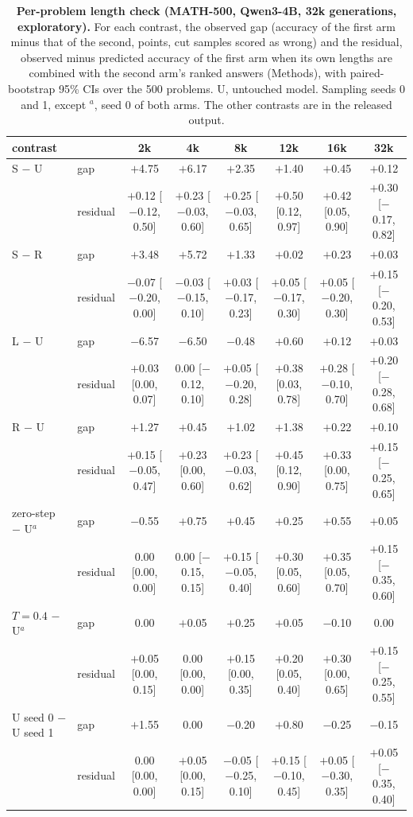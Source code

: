 \documentclass[10pt]{article}
\begin{document}
\begin{table}[h]
\centering\scriptsize
\caption{\textbf{Per-problem length check (MATH-500, Qwen3-4B, 32k generations, exploratory).} For each contrast, the observed gap (accuracy of the first arm minus that of the second, points, cut samples scored as wrong) and the residual, observed minus predicted accuracy of the first arm when its own lengths are combined with the second arm's ranked answers (Methods), with paired-bootstrap 95\% CIs over the 500 problems. U, untouched model. Sampling seeds 0 and 1, except $^{a}$, seed 0 of both arms. The other contrasts are in the released output.}
\label{tab:spred}
\setlength{\tabcolsep}{2.5pt}
\begin{tabular}{llcccccc}
\toprule
contrast & & 2k & 4k & 8k & 12k & 16k & 32k \\
\midrule
S $-$ U & gap & $+$4.75 & $+$6.17 & $+$2.35 & $+$1.40 & $+$0.45 & $+$0.12 \\
 & residual & $+$0.12 [$-$0.12, 0.50] & $+$0.23 [$-$0.03, 0.60] & $+$0.25 [$-$0.03, 0.65] & $+$0.50 [0.12, 0.97] & $+$0.42 [0.05, 0.90] & $+$0.30 [$-$0.17, 0.82] \\[2pt]
S $-$ R & gap & $+$3.48 & $+$5.72 & $+$1.33 & $+$0.02 & $+$0.23 & $+$0.03 \\
 & residual & $-$0.07 [$-$0.20, 0.00] & $-$0.03 [$-$0.15, 0.10] & $+$0.03 [$-$0.17, 0.23] & $+$0.05 [$-$0.17, 0.30] & $+$0.05 [$-$0.20, 0.30] & $+$0.15 [$-$0.20, 0.53] \\[2pt]
L $-$ U & gap & $-$6.57 & $-$6.50 & $-$0.48 & $+$0.60 & $+$0.12 & $+$0.03 \\
 & residual & $+$0.03 [0.00, 0.07] & 0.00 [$-$0.12, 0.10] & $+$0.05 [$-$0.20, 0.28] & $+$0.38 [0.03, 0.78] & $+$0.28 [$-$0.10, 0.70] & $+$0.20 [$-$0.28, 0.68] \\[2pt]
R $-$ U & gap & $+$1.27 & $+$0.45 & $+$1.02 & $+$1.38 & $+$0.22 & $+$0.10 \\
 & residual & $+$0.15 [$-$0.05, 0.47] & $+$0.23 [0.00, 0.60] & $+$0.23 [$-$0.03, 0.62] & $+$0.45 [0.12, 0.90] & $+$0.33 [0.00, 0.75] & $+$0.15 [$-$0.25, 0.65] \\[2pt]
zero-step $-$ U$^{a}$ & gap & $-$0.55 & $+$0.75 & $+$0.45 & $+$0.25 & $+$0.55 & $+$0.05 \\
 & residual & 0.00 [0.00, 0.00] & 0.00 [$-$0.15, 0.15] & $+$0.15 [$-$0.05, 0.40] & $+$0.30 [0.05, 0.60] & $+$0.35 [0.05, 0.70] & $+$0.15 [$-$0.35, 0.60] \\[2pt]
$T{=}0.4$ $-$ U$^{a}$ & gap & 0.00 & $+$0.05 & $+$0.25 & $+$0.05 & $-$0.10 & 0.00 \\
 & residual & $+$0.05 [0.00, 0.15] & 0.00 [0.00, 0.00] & $+$0.15 [0.00, 0.35] & $+$0.20 [0.05, 0.40] & $+$0.30 [0.00, 0.65] & $+$0.15 [$-$0.25, 0.55] \\[2pt]
U seed 0 $-$ U seed 1 & gap & $+$1.55 & 0.00 & $-$0.20 & $+$0.80 & $-$0.25 & $-$0.15 \\
 & residual & 0.00 [0.00, 0.00] & $+$0.05 [0.00, 0.15] & $-$0.05 [$-$0.25, 0.10] & $+$0.15 [$-$0.10, 0.45] & $+$0.05 [$-$0.30, 0.35] & $+$0.05 [$-$0.35, 0.40] \\
\bottomrule
\end{tabular}
\end{table}
\end{document}
